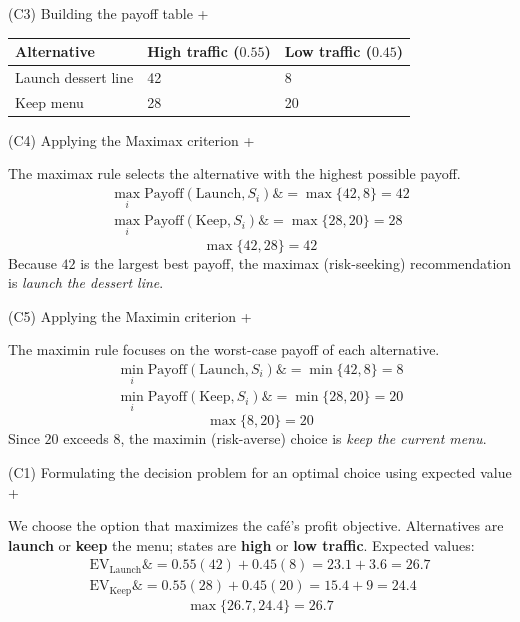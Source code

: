 \documentclass[11pt]{article}
\begin{document}
	
	
	
	
	
	(C3) Building the payoff table
	+
	
	
	\begin{center}
		\begin{tabular}{lll}
			\toprule
			Alternative & High traffic
			($0.55$) & Low traffic
			($0.45$) \\
			\midrule
			Launch dessert line & 42 & 8 \\
			Keep menu & 28 & 20 \\
			\bottomrule
		\end{tabular}
	\end{center}
	
	
	
	
	
	
	(C4) Applying the Maximax criterion
	+
	
	
	The maximax rule selects the alternative with the highest possible payoff.
	\[
	\begin{aligned}
		\max_i \text{Payoff}(\text{Launch}, S_i) \&= \max\{42, 8\} = 42 \\
		\max_i \text{Payoff}(\text{Keep}, S_i) \&= \max\{28, 20\} = 28
	\end{aligned}
	\]
	\[
	\max\{42, 28\} = 42
	\]
Because $42$ is the largest best payoff, the maximax (risk-seeking) recommendation is \emph{launch the dessert line}.
	
	
	
	
	
	(C5) Applying the Maximin criterion
	+
	
	
	The maximin rule focuses on the worst-case payoff of each alternative.
	\[
	\begin{aligned}
		\min_i \text{Payoff}(\text{Launch}, S_i) \&= \min\{42, 8\} = 8 \\
		\min_i \text{Payoff}(\text{Keep}, S_i) \&= \min\{28, 20\} = 20
	\end{aligned}
	\]
	\[
	\max\{8, 20\} = 20
	\]
Since $20$ exceeds $8$, the maximin (risk-averse) choice is \emph{keep the current menu}.
	
	
	
	
	
	(C1) Formulating the decision problem for an optimal choice using expected value
	+
	
	
	We choose the option that maximizes the café's profit objective. Alternatives are \textbf{launch} or
	\textbf{keep} the menu; states are \textbf{high} or \textbf{low traffic}. Expected values:
	\[
	\begin{aligned}
		\mathrm{EV}_{\text{Launch}} \&= 0.55(42) + 0.45(8) = 23.1 + 3.6 = 26.7 \\
		\mathrm{EV}_{\text{Keep}} \&= 0.55(28) + 0.45(20) = 15.4 + 9 = 24.4
	\end{aligned}
	\]
	\[
	\max\{26.7, 24.4\} = 26.7
	\]
	
\end{document}
